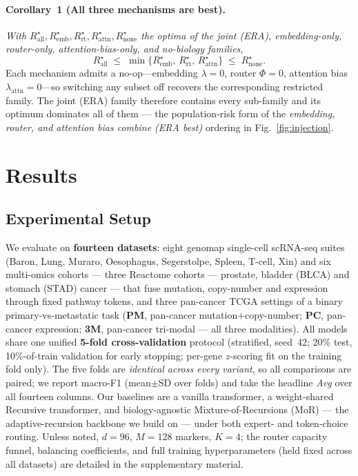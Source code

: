 \documentclass[letterpaper]{article}
\begin{document}
\paragraph{Corollary~1 (All three mechanisms are best).}
\emph{With $R^\star_{\mathrm{all}},R^\star_{\mathrm{emb}},R^\star_{\mathrm{rt}},R^\star_{\mathrm{attn}},R^\star_{\mathrm{none}}$
the optima of the joint (ERA), embedding-only, router-only, attention-bias-only, and no-biology families,}
\begin{equation*}
R^\star_{\mathrm{all}}\;\le\;\min\{R^\star_{\mathrm{emb}},\,R^\star_{\mathrm{rt}},\,R^\star_{\mathrm{attn}}\}\;\le\;R^\star_{\mathrm{none}}.
\end{equation*}
Each mechanism admits a no-op---embedding $\lambda{=}0$, router $\Phi{=}0$, attention bias
$\lambda_{\mathrm{attn}}{=}0$---so switching any subset off recovers the corresponding restricted
family. The joint (ERA) family therefore contains every sub-family and its optimum dominates all of
them --- the population-risk form of the \emph{embedding, router, and attention bias combine (ERA
best)} ordering in Fig.~\ref{fig:injection}.

\section{Results}

\subsection{Experimental Setup}
We evaluate on \textbf{fourteen datasets}: eight genomap single-cell scRNA-seq suites
\cite{islam2023cartography} (Baron, Lung, Muraro, Oesophagus, Segerstolpe, Spleen, T-cell,
Xin) and six multi-omics cohorts --- three Reactome cohorts --- prostate, bladder (BLCA) and stomach (STAD) cancer --- that
fuse mutation, copy-number and expression through fixed pathway tokens, and three pan-cancer
TCGA settings of a binary primary-vs-metastatic task (\textbf{PM}, pan-cancer mutation$+$copy-number; \textbf{PC}, pan-cancer expression; \textbf{3M}, pan-cancer tri-modal --- all three modalities). All models share one unified \textbf{5-fold
cross-validation} protocol (stratified, seed~42; 20\% test, 10\%-of-train validation for early
stopping; per-gene $z$-scoring fit on the training fold only). The five folds are
\emph{identical across every variant}, so all comparisons are paired; we report macro-F1
(mean$\pm$SD over folds) and take the headline \emph{Avg} over all fourteen columns. Our
baselines are a vanilla transformer, a weight-shared Recursive transformer, and
biology-agnostic Mixture-of-Recursions (MoR) --- the adaptive-recursion backbone we build on
--- under both expert- and token-choice routing. Unless noted, $d{=}96$, $M{=}128$ markers,
$K{=}4$; the router capacity funnel, balancing coefficients, and full training hyperparameters
(held fixed across all datasets) are detailed in the supplementary material.
\end{document}
